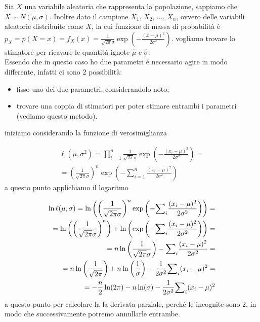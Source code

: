 \begin{esempio}
Sia $X$ una variabile aleatoria che rappresenta la popolazione, sappiamo che $X\sim N(\mu, \sigma)$. Inoltre dato il campione $X_1,\, X_2,\, ...,\, X_n$, ovvero delle variabili aleatorie distribuite come $X$, la cui funzione di massa di probabilità è $p_X = p(X = x) = f_X(x) = \frac{1}{\sqrt{2 \pi} \sigma} \exp{\!\left(-\frac{(x-\mu)^2}{2\sigma^2} \right)}$.
vogliamo trovare lo stimatore per ricavare le quantità ignote $\hat{\mu}$ e $\hat{\sigma}$. \\

Essendo che in questo caso ho due parametri è necessario agire in modo differente, infatti ci sono 2 possibilità:
\begin{itemize}
    \item fisso uno dei due parametri, considerandolo noto;
    \item trovare una coppia di stimatori per poter stimare entrambi i parametri (vediamo questo metodo).
\end{itemize}
\noindent iniziamo considerando la funzione di verosimiglianza

\begin{align}
    \ell(\mu, \sigma^2) = \prod_{i = 1}^n \frac{1}{\sqrt{2\pi}\sigma}\exp\left( -\frac{(x_i - \mu)^2}{2\sigma^2} \right) = \\
    = \left( \frac{1}{\sqrt{2\pi}\sigma} \right)^n \exp\left( -\sum_{i=1}^n \frac{(x_i - \mu)^2}{2\sigma^2} \right)
\end{align}
\noindent a questo punto applichiamo il logaritmo

\begin{align}
    \ln \ell(\mu, \sigma) = \ln \left( \left( \frac{1}{\sqrt{2\pi}\sigma} \right)^n \exp\left( -{\sum}_i \frac{(x_i - \mu)^2}{2\sigma^2} \right) \right) = \\
    = \ln \left( \left( \frac{1}{\sqrt{2\pi}\sigma} \right)^n \right) + \ln \left(\exp\left( -{\sum}_i \frac{(x_i - \mu)^2}{2\sigma^2} \right) \right) = \\
    = n \ln \left( \frac{1}{\sqrt{2\pi}\sigma} \right) - {\sum}_i \frac{(x_i - \mu)^2}{2\sigma^2} = \\
    = n \ln \left( \frac{1}{\sqrt{2\pi}} \right) + n\ln \left( \frac{1}{\sigma}\right) - \frac{1}{2\sigma^2}{\sum}_i (x_i - \mu)^2
    = \\
    = -\frac{n}{2} \ln(2\pi) - n\ln(\sigma) - \frac{1}{2\sigma^2} {\sum}_i (x_i - \mu)^2
\end{align}
\noindent a questo punto per calcolare la la derivata parziale, perché le incognite sono $2$, in modo che successivamente potremo annullarle entrambe. \\


\end{esempio}
